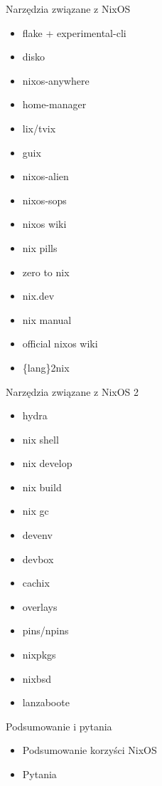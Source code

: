 \documentclass{beamer}
\begin{document}
\begin{frame}{Narzędzia związane z NixOS}
    \begin{itemize}
        \item flake + experimental-cli
        \item disko
        \item nixos-anywhere
        \item home-manager
        \item lix/tvix
        \item guix
        \item nixos-alien
        \item nixos-sops
        \item nixos wiki
        \item nix pills
        \item zero to nix
        \item nix.dev
        \item nix manual
        \item official nixos wiki
        \item \{lang\}2nix
    \end{itemize}
\end{frame}

\begin{frame}{Narzędzia związane z NixOS 2}
    \begin{itemize}
        \item hydra
        \item nix shell
        \item nix develop
        \item nix build
        \item nix gc
        \item devenv
        \item devbox
        \item cachix
        \item overlays
        \item pins/npins
        \item nixpkgs
        \item nixbsd
        \item lanzaboote
    \end{itemize}
\end{frame}

\begin{frame}{Podsumowanie i pytania}
    \begin{itemize}
        \item Podsumowanie korzyści NixOS
        \item Pytania
    \end{itemize}
\end{frame}
\end{document}
